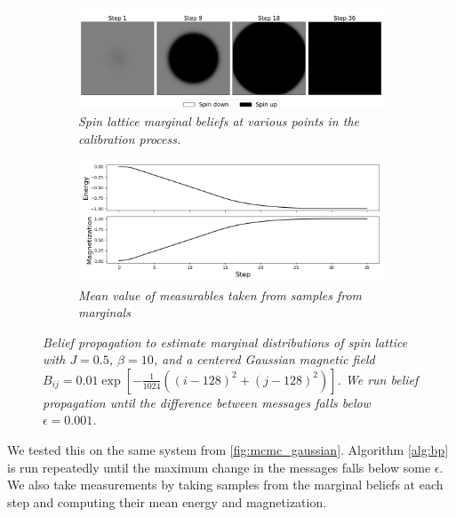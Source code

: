 \documentclass{article}
\begin{document}
\begin{figure}
    \begin{subfigure}{\textwidth}
        \includegraphics[width=\textwidth]{report_bp_gaussian}
        \centering
        \caption{\textit{
            Spin lattice marginal beliefs at various points in the calibration 
            process. 
        }}
        \label{fig:bp_gaussian_a}
    \end{subfigure}
    \begin{subfigure}{\textwidth}
        \includegraphics[width=\textwidth]{report_bp_gaussian_measurables}
        \centering
        \caption{\textit{Mean value of measurables taken from samples from marginals}}
        \label{fig:bp_gaussian_b}
    \end{subfigure}
    \centering
    \caption{\textit{
        Belief propagation to estimate marginal distributions of spin lattice 
        with $J = 0.5$, $\beta = 10$, and a centered Gaussian 
        magnetic field
        $B_{ij} = 0.01 \exp [-\frac{1}{1024}((i-128)^2 + (j-128)^2)]$. 
        We run belief propagation until the difference between messages falls 
        below $\epsilon = 0.001$. 
    }}
    \label{fig:bp_gaussian}
\end{figure}

We tested this on the same system from \ref{fig:mcmc_gaussian}. 
Algorithm \ref{alg:bp} is run repeatedly until the maximum change in the 
messages falls below some $\epsilon$. 
We also take measurements by taking samples from the marginal beliefs at 
each step and computing their mean energy and magnetization. 
\end{document}
